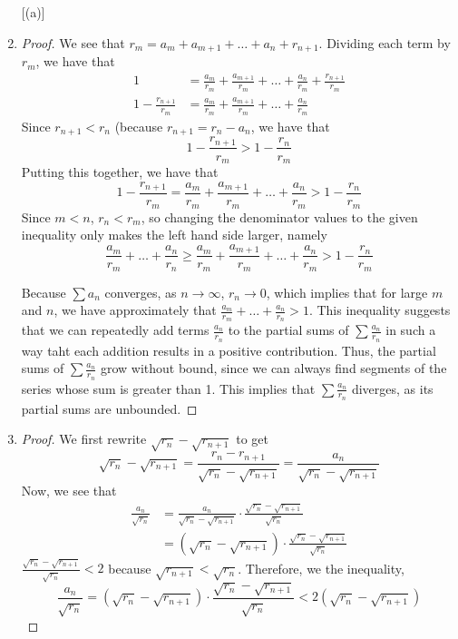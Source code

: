 \documentclass[11pt]{article}
\begin{document}
\begin{exercise}{12}
    \begin{enumerate} [(a)]
        \item \begin{proof}
            We see that $r_m = a_m + a_{m+1} + \dots + a_n + r_{n+1}$. Dividing each term by $r_m$, we have that \begin{equation*}
                \begin{split}
                    1 & = \frac{a_m}{r_m} + \frac{a_{m+1}}{r_m} + \dots + \frac{a_n}{r_m} + \frac{r_{n+1}}{r_m} \\
                    1 - \frac{r_{n+1}}{r_m} & = \frac{a_m}{r_m} + \frac{a_{m+1}}{r_m} + \dots + \frac{a_n}{r_m}
                \end{split}
            \end{equation*}
            Since $r_{n+1} < r_n$ (because $r_{n+1} = r_n - a_n$, we have that $$1 - \frac{r_{n+1}}{r_m} > 1 - \frac{r_n}{r_m}$$ Putting this together, we have that $$1 - \frac{r_{n+1}}{r_m} = \frac{a_m}{r_m} + \frac{a_{m+1}}{r_m} + \dots + \frac{a_n}{r_m} > 1 - \frac{r_n}{r_m}$$ Since $m < n$, $r_n < r_m$, so changing the denominator values to the given inequality only makes the left hand side larger, namely $$\frac{a_m}{r_m} + \dots + \frac{a_n}{r_n} \ge  \frac{a_m}{r_m} + \frac{a_{m+1}}{r_m} + \dots + \frac{a_n}{r_m} > 1 - \frac{r_n}{r_m}$$

            Because $\sum a_n$ converges, as $n \to \infty$, $r_n \to 0$, which implies that for large $m$ and $n$, we have approximately that $\frac{a_m}{r_m} + \dots + \frac{a_n}{r_n} > 1$. This inequality suggests that we can repeatedly add terms $\frac{a_n}{r_n}$ to the partial sums of $\sum \frac{a_n}{r_n}$ in such a way taht each addition results in a positive contribution. Thus, the partial sums of $\sum \frac{a_n}{r_n}$ grow without bound, since we can always find segments of the series whose sum is greater than 1. This implies that $\sum \frac{a_n}{r_n}$ diverges, as its partial sums are unbounded. 
        \end{proof}
        \item \begin{proof}
            We first rewrite $\sqrt{r_n} - \sqrt{r_{n+1}}$ to get $$\sqrt{r_n} - \sqrt{r_{n+1}} = \frac{r_n - r_{n+1}}{\sqrt{r_n} - \sqrt{r_{n+1}}} = \frac{a_n}{\sqrt{r_n} - \sqrt{r_{n+1}}}$$ Now, we see that \begin{equation*}
                \begin{split}
                    \frac{a_n}{\sqrt{r_n}} & = \frac{a_n}{\sqrt{r_n} - \sqrt{r_{n+1}}} \cdot \frac{\sqrt{r_n} - \sqrt{r_{n+1}}}{\sqrt{r_n}} \\
                    & = (\sqrt{r_n} - \sqrt{r_{n+1}}) \cdot \frac{\sqrt{r_n} - \sqrt{r_{n+1}}}{\sqrt{r_n}}
                \end{split}
            \end{equation*}
            $\frac{\sqrt{r_n} - \sqrt{r_{n+1}}}{\sqrt{r_n}} < 2$ because $\sqrt{r_{n+1}} < \sqrt{r_n}$. Therefore, we the inequality, $$\frac{a_n}{\sqrt{r_n}} = (\sqrt{r_n} - \sqrt{r_{n+1}}) \cdot \frac{\sqrt{r_n} - \sqrt{r_{n+1}}}{\sqrt{r_n}} < 2 (\sqrt{r_n} - \sqrt{r_{n+1}})$$


\end{proof}
\end{enumerate}
\end{exercise}
\end{document}
